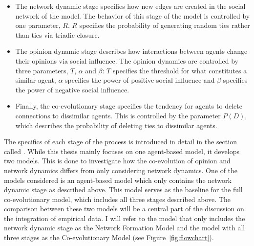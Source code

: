 \documentclass[11pt]{article}
\begin{document}
\begin{itemize}
    \item The network dynamic stage specifies how new edges are created in the social network of the model. The behavior of this stage of the model is controlled by one parameter, $R$. $R$ specifies the probability of generating random ties rather than ties via triadic closure.
    \item The opinion dynamic stage describes how interactions between agents change their opinions via social influence. The opinion dynamics are controlled by three parameters, $T$, $\alpha$ and $\beta$: $T$ specifies the threshold for what constitutes a similar agent, $\alpha$ specifies the power of positive social influence and $\beta$ specifies the power of negative social influence.
    \item Finally, the co-evolutionary stage specifies the tendency for agents to delete connections to dissimilar agents. This is controlled by the parameter $P(D)$, which describes the probability of deleting ties to dissimilar agents.
\end{itemize}

\noindent The specifics of each stage of the process is introduced in detail in the section called \textit{}. While this thesis mainly focuses on one agent-based model, it develops two models. This is done to investigate how the co-evolution of opinion and network dynamics differs from only considering network dynamics. 
One of the models considered is an agent-based model which only contains the network dynamic stage as described above. This model serves as the baseline for the full co-evolutionary model, which includes all three stages described above. The comparison between these two models will be a central part of the discussion on the integration of empirical data. I will refer to the model that only includes the network dynamic stage as the Network Formation Model and the model with all three stages as the Co-evolutionary Model (see Figure~\ref{fig:flowchart}).
\end{document}
